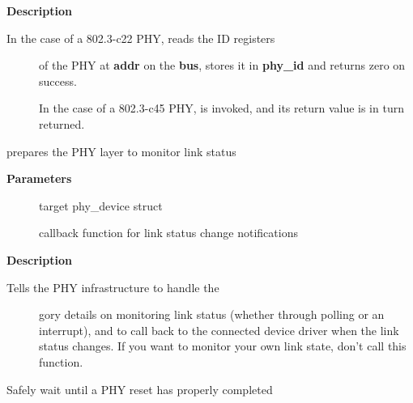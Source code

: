 \documentclass[a4paper,8pt,english]{sphinxmanual}
\begin{document}
\textbf{Description}
\begin{description}
\item[{In the case of a 802.3-c22 PHY, reads the ID registers}] \leavevmode
of the PHY at \textbf{addr} on the \textbf{bus}, stores it in \textbf{phy\_id} and returns
zero on success.

In the case of a 802.3-c45 PHY, {\hyperref[networking/kapi:c.get_phy_c45_ids]{\emph{}}} is invoked, and
its return value is in turn returned.

\end{description}

\begin{fulllineitems}
\label{networking/kapi:c.phy_prepare_link}
prepares the PHY layer to monitor link status

\end{fulllineitems}


\textbf{Parameters}
\begin{description}
\item[{}] \leavevmode
target phy\_device struct

\item[{}] \leavevmode
callback function for link status change notifications

\end{description}

\textbf{Description}
\begin{description}
\item[{Tells the PHY infrastructure to handle the}] \leavevmode
gory details on monitoring link status (whether through
polling or an interrupt), and to call back to the
connected device driver when the link status changes.
If you want to monitor your own link state, don't call
this function.

\end{description}

\begin{fulllineitems}
\label{networking/kapi:c.phy_poll_reset}
Safely wait until a PHY reset has properly completed

\end{fulllineitems}
\end{document}
